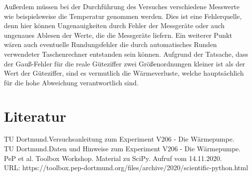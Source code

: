 \documentclass[titlepage=firstcover, captions=tableheading]{scrartcl}
\begin{document}
\noindent Außerdem müssen bei der Durchführung des Versuches verschiedene Messwerte wie beispielsweise die Temperatur genommen werden.
Dies ist eine Fehlerquelle, denn hier können Ungenauigkeiten durch Fehler der Messgeräte oder auch ungenaues Ablesen der Werte, die die Messgeräte liefern.
Ein weiterer Punkt wären auch eventuelle Rundungsfehler die durch automatisches Runden verwendeter Taschenrechner entstanden sein können.
Aufgrund der Tatsache, dass der Gauß-Fehler für die reale Güteziffer zwei Größenordnungen kleiner ist als der Wert der Güteziffer,
sind es vermutlich die Wärmeverluste, welche hauptsächlich für die hohe Abweichung verantwortlich sind. 

\section{Literatur}
TU Dortmund.Versuchsanleitung zum Experiment V206 - Die Wärmepumpe.\\
TU Dortmund.Daten und Hinweise zum Experiment V206 - Die Wärmepumpe.\\
PeP et al. Toolbox Workshop. Material zu SciPy. Aufruf vom 14.11.2020.\\
URL: https://toolbox.pep-dortmund.org/files/archive/2020/scientific-python.html
\end{document}
